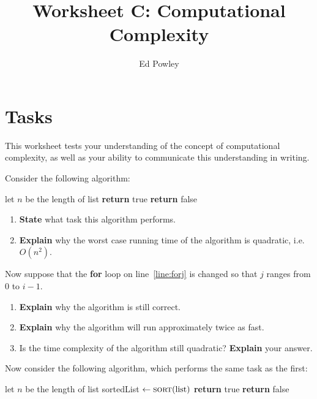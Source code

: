 \documentclass{../../../fal_assignment}
\title{Worksheet C: Computational Complexity}
\author{Ed Powley}
\begin{document}
\maketitle
{}

\section*{Tasks}

This worksheet tests your understanding of the concept of computational complexity,
as well as your ability to communicate this understanding in writing.

Consider the following algorithm:

\begin{algorithmic}[1]
		\State let $n$ be the length of list
			 \label{line:forj}
					\State \textbf{return} true
				\EndIf
			\EndFor
		\EndFor
		\State \textbf{return} false
	\EndProcedure
\end{algorithmic}

\begin{enumerate}[label=(\alph*)]
	\item\label{q:first} \textbf{State} what task this algorithm performs.
	\item \textbf{Explain} why the worst case running time of the algorithm is quadratic, i.e.\ $O(n^2)$.
\end{enumerate}

Now suppose that the \textbf{for} loop on line~\ref{line:forj} is changed so that $j$ ranges from $0$ to $i-1$.

\begin{enumerate}[resume,label=(\alph*)]
	\item \textbf{Explain} why the algorithm is still correct.
	\item \textbf{Explain} why the algorithm will run approximately twice as fast.
	\item Is the time complexity of the algorithm still quadratic? \textbf{Explain} your answer.
\end{enumerate}

Now consider the following algorithm, which performs the same task as the first:

\begin{algorithmic}[1]
		\State let $n$ be the length of list
		\State sortedList $\gets \Call{sort}{\text{list}}$
				\State \textbf{return} true
			\EndIf
		\EndFor
		\State \textbf{return} false
	\EndProcedure
\end{algorithmic}
\end{document}
